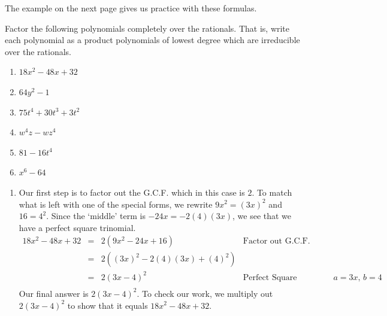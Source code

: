 \documentclass{ximera}
\begin{document}

 

The example on the next page gives us practice with these formulas.

\pagebreak

\begin{example}\label{FormulaFactoring}  Factor the following polynomials completely over the rationals.  That is, write each polynomial as a product polynomials of lowest degree which are irreducible over the rationals. 

\begin{enumerate}

\item  $18x^2 - 48x + 32$  

\item  $64y^2 - 1$ 

\item  $75t^4 + 30t^3 + 3t^2$

\item  $w^4 z - w z^4$

\item  \label{quadinform1} $81 - 16t^4$ 

\item  \label{quadinform2} $x^6 - 64$

\setcounter{HW}{\value{enumi}}

\end{enumerate}

\begin{explanation}

\begin{enumerate}
\item  Our first step is to factor out the G.C.F. which in this case is $2$.  To match what is left with one of the special forms, we rewrite $9x^2 = (3x)^2$ and $16 = 4^2$. Since the `middle' term is $-24x = -2(4)(3x)$, we see that we have a perfect square trinomial.\[ \begin{array}{rclr}

18x^2 - 48x + 32 & = & 2(9x^2 - 24x + 16) & \text{Factor out G.C.F.}\\
                 & = & 2((3x)^2 - 2(4)(3x) + (4)^2) & \\
								 & = & 2(3x-4)^2 & \text{Perfect Square Trinomial:  $a = 3x$, $b=4$} \\ \end{array}\]Our final answer is $2(3x-4)^2$.  To check our work, we multiply out $2(3x-4)^2$ to show that it equals $18x^2 - 48x + 32$.
 

\end{enumerate}
\end{explanation}
\end{example}
\end{document}
